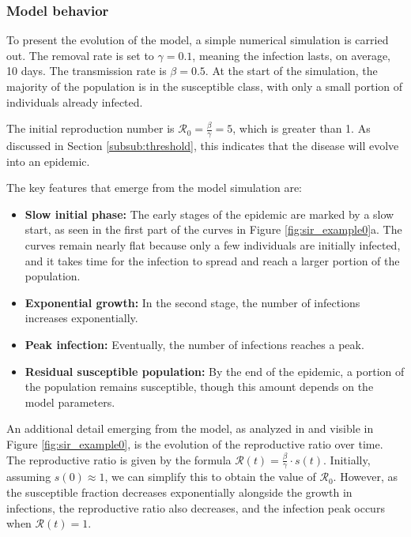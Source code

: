 \subsubsection{Model behavior}

To present the evolution of the model, a simple numerical simulation is carried out. The removal rate is set to $\gamma = 0.1$, meaning the infection lasts, on average, 10 days. The transmission rate is $\beta = 0.5$. At the start of the simulation, the majority of the population is in the susceptible class, with only a small portion of individuals already infected.

The initial reproduction number is  $\mathcal{R}_0 = \frac{\beta}{\gamma} =  5$, which is greater than 1. As discussed in Section \ref{subsub:threshold}, this indicates that the disease will evolve into an epidemic.

The key features that emerge from the model simulation are:

\begin{itemize}
	\item \textbf{Slow initial phase:} The early stages of the epidemic are marked by a slow start, as seen in the first part of the curves in Figure \ref{fig:sir_example0}a. The curves remain nearly flat because only a few individuals are initially infected, and it takes time for the infection to spread and reach a larger portion of the population.
	\item \textbf{Exponential growth:} In the second stage, the number of infections increases exponentially.
	\item \textbf{Peak infection:} Eventually, the number of infections reaches a peak.
	\item \textbf{Residual susceptible population:} By the end of the epidemic, a portion of the population remains susceptible, though this amount depends on the model parameters.
\end{itemize}

An additional detail emerging from the model, as analyzed in \cite{Okabe_2020} and visible in Figure \ref{fig:sir_example0}, is the evolution of the reproductive ratio over time. The reproductive ratio is given by the formula $\mathcal{R}(t) = \frac{\beta}{\gamma} \cdot s(t)$. Initially, assuming $s(0)\approx 1$, we can simplify this to obtain the value of $\mathcal{R}_0$. However, as the susceptible fraction decreases exponentially alongside the growth in infections, the reproductive ratio also decreases, and the infection peak occurs when $\mathcal{R}(t)=1$.


